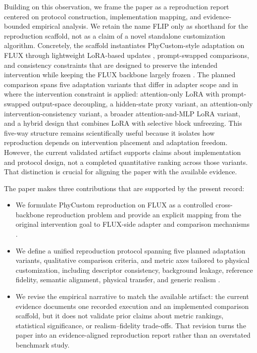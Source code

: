 \documentclass{article}
\begin{document}
Building on this observation, we frame the paper as a reproduction report centered on protocol construction, implementation mapping, and evidence-bounded empirical analysis. We retain the name FLIP only as shorthand for the reproduction scaffold, not as a claim of a novel standalone customization algorithm. Concretely, the scaffold instantiates PhyCustom-style adaptation on FLUX through lightweight LoRA-based updates \cite{hu2021lora}, prompt-swapped comparisons, and consistency constraints that are designed to preserve the intended intervention while keeping the FLUX backbone largely frozen \cite{blackforestlabs2024fluxdev}. The planned comparison spans five adaptation variants that differ in adapter scope and in where the intervention constraint is applied: attention-only LoRA with prompt-swapped output-space decoupling, a hidden-state proxy variant, an attention-only intervention-consistency variant, a broader attention-and-MLP LoRA variant, and a hybrid design that combines LoRA with selective block unfreezing. This five-way structure remains scientifically useful because it isolates how reproduction depends on intervention placement and adaptation freedom. However, the current validated artifact supports claims about implementation and protocol design, not a completed quantitative ranking across those variants. That distinction is crucial for aligning the paper with the available evidence.

The paper makes three contributions that are supported by the present record:
\begin{itemize}
    \item We formulate PhyCustom reproduction on FLUX as a controlled cross-backbone reproduction problem and provide an explicit mapping from the original intervention goal to FLUX-side adapter and comparison mechanisms \cite{wu2025phycustom,blackforestlabs2024fluxdev}.
    \item We define a unified reproduction protocol spanning five planned adaptation variants, qualitative comparison criteria, and metric axes tailored to physical customization, including descriptor consistency, background leakage, reference fidelity, semantic alignment, physical transfer, and generic realism \cite{ruiz2023dreambooth,hu2021lora}.
    \item We revise the empirical narrative to match the available artifact: the current evidence documents one recorded execution and an implemented comparison scaffold, but it does not validate prior claims about metric rankings, statistical significance, or realism--fidelity trade-offs. That revision turns the paper into an evidence-aligned reproduction report rather than an overstated benchmark study.
\end{itemize}
\end{document}
